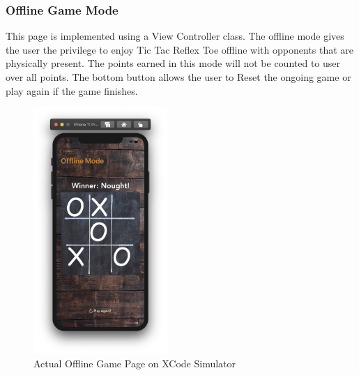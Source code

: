 \documentclass{article}
\begin{document}
    \subsubsection{Offline Game Mode}
    This page is implemented using a View Controller class.  The offline mode gives the user the privilege to enjoy Tic Tac Reflex Toe offline with opponents that are physically present.  The points earned in this mode will not be counted to user over all points.  The bottom button allows the user to Reset the ongoing game or play again if the game finishes.
        \begin{figure}[h]
            \centering
            \includegraphics[width=2in]{images/sim_off.png}
        \caption{Actual Offline Game Page on XCode Simulator}
        \end{figure}  
        \newpage
\end{document}
